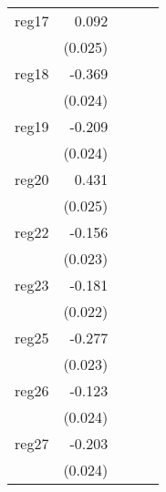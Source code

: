 {\begin{longtable}{l*{4}{D{.}{.}{-1}}}
\addlinespace
reg17       &       0.092\sym{***}&                     &                     &                     \\
            &     (0.025)         &                     &                     &                     \\
\addlinespace
reg18       &      -0.369\sym{***}&                     &                     &                     \\
            &     (0.024)         &                     &                     &                     \\
\addlinespace
reg19       &      -0.209\sym{***}&                     &                     &                     \\
            &     (0.024)         &                     &                     &                     \\
\addlinespace
reg20       &       0.431\sym{***}&                     &                     &                     \\
            &     (0.025)         &                     &                     &                     \\
\addlinespace
reg22       &      -0.156\sym{***}&                     &                     &                     \\
            &     (0.023)         &                     &                     &                     \\
\addlinespace
reg23       &      -0.181\sym{***}&                     &                     &                     \\
            &     (0.022)         &                     &                     &                     \\
\addlinespace
reg25       &      -0.277\sym{***}&                     &                     &                     \\
            &     (0.023)         &                     &                     &                     \\
\addlinespace
reg26       &      -0.123\sym{***}&                     &                     &                     \\
            &     (0.024)         &                     &                     &                     \\
\addlinespace
reg27       &      -0.203\sym{***}&                     &                     &                     \\
            &     (0.024)         &                     &                     &                     \\

\end{longtable}}
